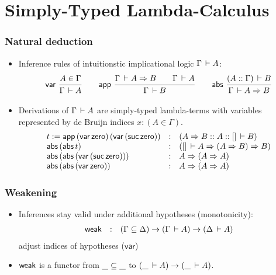 \documentclass[t,fleqn,usenames,dvipsnames]{beamer}
\begin{document}
\section{Simply-Typed Lambda-Calculus}

\newcommand{\tvar}{\mathsf{var}}
\newcommand{\tapp}{\mathsf{app}}
\newcommand{\tabs}{\mathsf{abs}}


\begin{frame}%
  \frametitle{Natural deduction}
  \vspace{-3ex}
  \begin{itemize}
  \item Inference rules of intuitionstic implicational logic
    $\Gamma \,\vdash A$:
\[
  \nru{\tvar}{A \in \Gamma}{\Gamma \der A}
\qquad
  \nru{\tapp
     }{\Gamma \der A \To B \qquad \Gamma \der A
     }{\Gamma \der B}
\qquad
  \nru{\tabs
     }{(A :: \Gamma) \der B
     }{\Gamma \der A \To B}
\]
  \item Derivations of $\Gamma \,\vdash A$ are simply-typed lambda-terms
  with variables represented by de Bruijn indices $x : (A \in
  \Gamma)$.
\[
  \begin{array}{lcl}
t := \tapp\,(\tvar\,\tzero)\,(\tvar\,(\tsuc\,\tzero)) & : & (A \To B :: A ::
    [] \der B) \\
\tabs\,(\tabs\,t) & : & ([] \der A \To (A \To B) \To B) \\
\tabs\,(\tabs\,(\tvar\,(\tsuc\,\tzero))) & : & A \To (A \To A) \\
\tabs\,(\tabs\,(\tvar\,\tzero)) & : & A \To (A \To A) \\
  \end{array}
\]
  \end{itemize}
\end{frame}


\begin{frame}%
  \frametitle{Weakening}
  \vspace{-3ex}
  \begin{itemize}
  \item Inferences stay valid under additional hypotheses
    (monotonicity):
\[
  \begin{array}{lcl}
    \mathsf{weak} & : & (\Gamma \subseteq \Delta) \to (\Gamma \,\vdash A) \to
                 (\Delta \,\vdash A)
  \end{array}
\]
  adjust indices of hypotheses ($\tvar$)
\\[2ex]
  \item $\mathsf{weak}$ is a functor from $\_\subseteq\_$ to
    $(\_ \,\vdash A) \to (\_ \,\vdash A)$.
  \end{itemize}
\end{frame}
\end{document}
